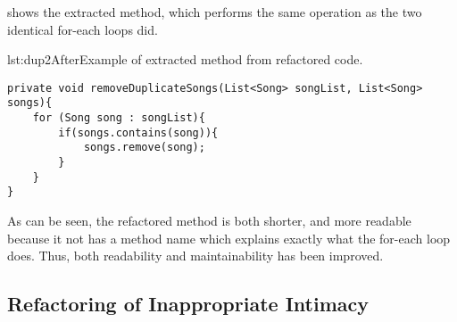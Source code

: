  shows the extracted method, which performs the same operation as the two identical for-each loops did.

\begin{code}{lst:dup2After}{Example of extracted method from refactored code.}
\begin{lstlisting}
private void removeDuplicateSongs(List<Song> songList, List<Song> songs){
    for (Song song : songList){
        if(songs.contains(song)){
            songs.remove(song);
        }
    }
}
\end{lstlisting}
\end{code}

As can be seen, the refactored method is both shorter, and more readable because it not has a method name which explains exactly what the for-each loop does. Thus, both readability and maintainability has been improved.
\subsection{Refactoring of Inappropriate Intimacy}
